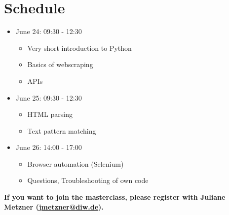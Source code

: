 \documentclass[a4paper]{article}
\begin{document}
\section{Schedule}

\begin{itemize}
    \item June 24: 09:30 - 12:30
    \begin{itemize}
        \item Very short introduction to Python
        \item Basics of webscraping
        \item APIs
    \end{itemize}
    \item June 25: 09:30 - 12:30
    \begin{itemize}
        \item HTML parsing
        \item Text pattern matching
    \end{itemize}
    \item June 26: 14:00 - 17:00
    \begin{itemize}
        \item Browser automation (Selenium)
        \item Questions, Troubleshooting of own code
    \end{itemize}
\end{itemize}

\textbf{If you want to join the masterclass, please register with
  Juliane Metzner (\href{mailto:jmetzner@diw.de}{jmetzner@diw.de}).}
\end{document}
